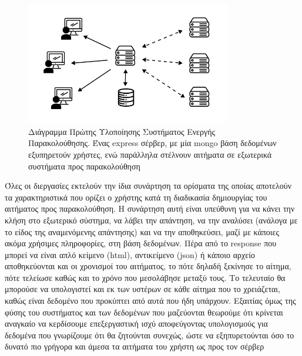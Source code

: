 \begin{figure}[!ht]
	\centering
	\includegraphics[width=0.8\textwidth]{./images/chapter4/lychte-first-implementation.png}
	\caption[Διάγραμμα πρώτης Υλοποίησης]{Διάγραμμα Πρώτης Υλοποίησης Συστήματος Ενεργής Παρακολούθησης. Ένας express σέρβερ, με μία mongo βάση δεδομένων εξυπηρετούν χρήστες, ενώ παράλληλα στέλνουν αιτήματα σε εξωτερικά συστήματα προς παρακολούθηση}
	\label{fig:first_implementation}
\end{figure}

Όλες οι διεργασίες εκτελούν την ίδια συνάρτηση τα ορίσματα της οποίας αποτελούν τα χαρακτηριστικά που ορίζει ο χρήστης
κατά τη διαδικασία δημιουργίας του αιτήματος προς παρακολούθηση. Η συνάρτηση αυτή είναι υπεύθυνη για να κάνει την κλήση στο εξωτερικό
σύστημα, να λάβει την απάντηση, να την αναλύσει (ανάλογα με το είδος της αναμενόμενης απάντησης) και να την αποθηκεύσει,
μαζί με κάποιες ακόμα χρήσιμες πληροφορίες, στη βάση δεδομένων. Πέρα από το response που μπορεί να είναι απλό κείμενο (html), αντικείμενο (json) ή κάποιο
αρχείο αποθηκεύονται και οι χρονισμοί του αιτήματος, το πότε δηλαδή ξεκίνησε το αίτημα, πότε τελείωσε καθώς και το χρόνο που μεσολάβησε μεταξύ τους. Το τελευταίο
θα μπορούσε να υπολογιστεί και εκ των υστέρων σε κάθε αίτημα που το χρειάζεται, καθώς είναι δεδομένο που προκύπτει από αυτά που ήδη υπάρχουν.
Εξαιτίας όμως της φύσης του συστήματος και των δεδομένων που μαζεύονται
θεωρούμε ότι κρίνεται αναγκαίο να κερδίσουμε επεξεργαστική ισχύ αποφεύγοντας υπολογισμούς 
για δεδομένα που γνωρίζουμε ότι θα ζητούνται συνεχώς, ώστε να εξηπυρετούνται όσο το δυνατό
πιο γρήγορα και άμεσα τα αιτήματα του χρήστη ως προς τον σέρβερ

